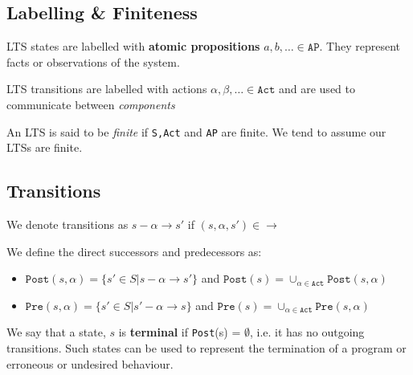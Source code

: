 \message{ !name(verif-revisionnotes.tex)}\documentclass{article}
\begin{document}
\subsection{Labelling \& Finiteness}

LTS states are labelled with \textbf{atomic propositions} $a,b,\ldots \in \texttt{AP} $. They represent facts or observations of the system.

LTS transitions are labelled with actions $\alpha,\beta,\ldots \in \texttt{Act} $ and are used to communicate between \textit{components}

An LTS is said to be \textit{finite} if \texttt{S,Act} and \texttt{AP} are finite. We tend to assume our LTSs are finite.

\subsection{Transitions}

We denote transitions as $s -\alpha\rightarrow s\prime$ if $(s,\alpha,s\prime) \in \rightarrow$

We define the direct successors and predecessors as:
\begin{itemize}
  \item $\texttt{Post}(s,\alpha)= \{ s\prime \in S | s-\alpha\rightarrow s\prime \}  $ and $\texttt{Post}(s) = \cup_{\alpha\in \texttt{Act} } \texttt{Post}(s,\alpha)$
  \item $\texttt{Pre} (s,\alpha) = \{ s\prime \in S | s\prime -\alpha \rightarrow s \} $ and $\texttt{Pre}(s) = \cup_{\alpha\in \texttt{Act} } \texttt{Pre}(s,\alpha) $
\end{itemize}

We say that a state, $s$ is \textbf{terminal} if \texttt{Post}(s) = $\emptyset$, i.e. it has no outgoing transitions. Such states can be used to represent the termination of a program or erroneous or undesired behaviour.
\end{document}
